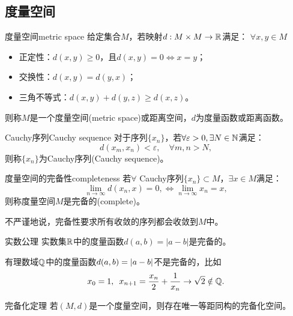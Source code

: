 \subsection{度量空间}

\begin{definition}
    {度量空间}{metric space}
    给定集合$M$，若映射$d:M\times M\to\mathbb R$满足：
    $\forall x,y\in M$
    \begin{itemize}
        \item 正定性：$d(x,y)\geq 0$，且$d(x,y)=0\iff x=y$；
        \item 交换性：$d(x,y)=d(y,x)$；
        \item 三角不等式：$d(x,y)+d(y,z)\geq d(x,z)$。
    \end{itemize}
    则称$M$是一个度量空间(metric space)或距离空间，$d$为度量函数或距离函数。
\end{definition}

\begin{definition}
    {Cauchy序列}{Cauchy sequence}
    对于序列$\{x_n\}$，若$\forall\varepsilon>0,\exists N\in\mathbb N$满足：
    \begin{equation}
        d(x_m,x_n)<\varepsilon,\quad\forall m,n>N,
    \end{equation}
    则称$\{x_n\}$为Cauchy序列(Cauchy sequence)。
\end{definition}

\begin{definition}
    {度量空间的完备性}{completeness}
    若$\forall$ Cauchy序列$\{x_n\}\subset M$，$\exists x\in M$满足：
    \[
        \lim_{n\to\infty}d(x_n,x)=0,\iff\lim_{n\to\infty}x_n=x,
    \]
    则称度量空间$M$是完备的(complete)。
\end{definition}

\begin{remark}
    不严谨地说，完备性要求所有收敛的序列都会收敛到$M$中。%
\end{remark}

\begin{example}
    {实数公理}{}
    实数集$\mathbb R$中的度量函数$d(a,b)=|a-b|$是完备的。
\end{example}

\begin{remark}
    有理数域$\mathbb Q$中的度量函数$d(a,b)=\left\lvert a-b\right\rvert$不是完备的，比如
    \[
        x_0=1,\enspace x_{n+1}=\frac{x_n}2+\frac1{x_n}\to\sqrt2\notin\mathbb Q.
    \]
\end{remark}

\begin{theorem}
    {完备化定理}{}
    若$(M,d)$是一个度量空间，则存在唯一等距同构的完备化空间。%
\end{theorem}

